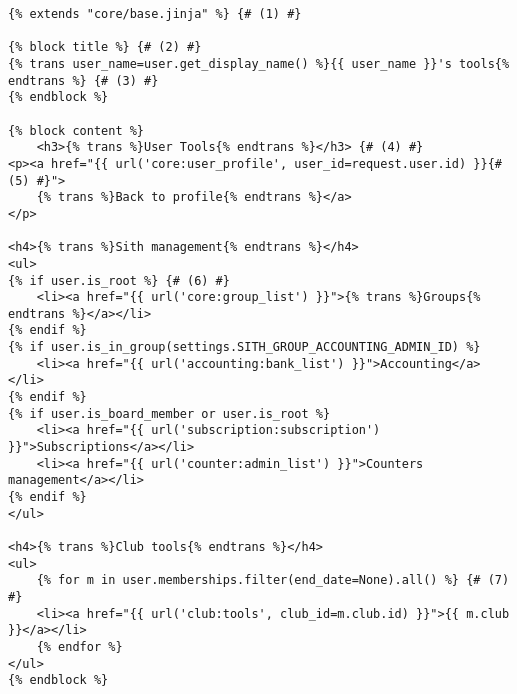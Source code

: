 \documentclass[a4paper]{report}
\begin{document}
\begin{addmargin}[-4em]{0em}
    \begin{verbatim}
{% extends "core/base.jinja" %} {# (1) #}

{% block title %} {# (2) #}
{% trans user_name=user.get_display_name() %}{{ user_name }}'s tools{% endtrans %} {# (3) #}
{% endblock %}

{% block content %}
    <h3>{% trans %}User Tools{% endtrans %}</h3> {# (4) #}
<p><a href="{{ url('core:user_profile', user_id=request.user.id) }}{# (5) #}">
    {% trans %}Back to profile{% endtrans %}</a>
</p>

<h4>{% trans %}Sith management{% endtrans %}</h4>
<ul>
{% if user.is_root %} {# (6) #}
    <li><a href="{{ url('core:group_list') }}">{% trans %}Groups{% endtrans %}</a></li>
{% endif %}
{% if user.is_in_group(settings.SITH_GROUP_ACCOUNTING_ADMIN_ID) %}
    <li><a href="{{ url('accounting:bank_list') }}">Accounting</a></li>
{% endif %}
{% if user.is_board_member or user.is_root %}
    <li><a href="{{ url('subscription:subscription') }}">Subscriptions</a></li>
    <li><a href="{{ url('counter:admin_list') }}">Counters management</a></li>
{% endif %}
</ul>

<h4>{% trans %}Club tools{% endtrans %}</h4>
<ul>
    {% for m in user.memberships.filter(end_date=None).all() %} {# (7) #}
    <li><a href="{{ url('club:tools', club_id=m.club.id) }}">{{ m.club }}</a></li>
    {% endfor %}
</ul>
{% endblock %}
    \end{verbatim}
\end{addmargin}
\end{document}
